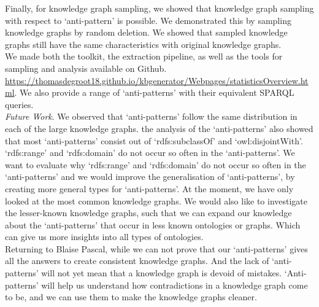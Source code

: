 \documentclass[11pt,letterpaper ,oneside ]{book}
\begin{document}
	Finally, for knowledge graph sampling, we showed that knowledge graph sampling with respect to `anti-pattern' is possible. We demonstrated this by sampling knowledge graphs by random deletion. We showed that sampled knowledge graphs still have the same characteristics with original knowledge graphs.\\
	
	We made both the toolkit, the extraction pipeline, as well as the tools for sampling and analysis available on Github. \\ \url{https://thomasdegroot18.github.io/kbgenerator/Webpages/statisticsOverview.html}. We also provide a range of `anti-patterns' with their equivalent SPARQL queries.\\
	\textit{Future Work}. We observed that `anti-patterns' follow the same distribution in each of the large knowledge graphs. the analysis of the `anti-patterns' also showed that most `anti-patterns' consist out of `rdfs:subclassOf' and `owl:disjointWith'. `rdfs:range' and `rdfs:domain' do not occur so often in the `anti-patterns'.
	We want to evaluate why `rdfs:range' and `rdfs:domain' do not occur so often in the `anti-patterns' and we would improve the generalisation of `anti-patterns', by creating more general types for `anti-patterns'. At the moment, we have only looked at the most common knowledge graphs. We would also like to investigate the lesser-known knowledge graphs, such that we can expand our knowledge about the `anti-patterns' that occur in less known ontologies or graphs. Which can give us more insights into all types of ontologies.\\
	
	Returning to Blaise Pascal, while we can not prove that our `anti-patterns' gives all the answers to create consistent knowledge graphs. And the lack of `anti-patterns' will not yet mean that a knowledge graph is devoid of mistakes. `Anti-patterns' will help us understand how contradictions in a knowledge graph come to be, and we can use them to make the knowledge graphs cleaner.
	
	\newpage
	
	
	
	
\end{document}

